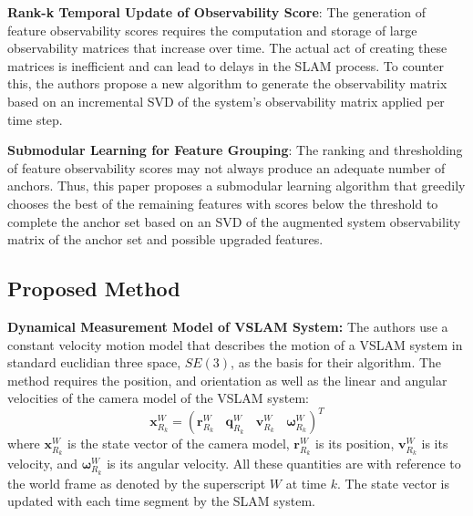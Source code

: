 \documentclass[10pt,twocolumn,letterpaper]{article}
\begin{document}
\textbf{Rank-k Temporal Update of Observability Score}: The generation of feature observability 
scores requires 
the computation and storage of large observability matrices that increase over time. 
The actual act of creating these matrices is inefficient and can lead to delays 
in the SLAM process. To counter this, the authors propose a new algorithm to generate the 
observability matrix 
based on an incremental SVD of the system's observability matrix applied per time step.

\textbf{Submodular Learning for Feature Grouping}: The ranking and thresholding of feature 
observability scores may not 
always produce an adequate number of anchors. 
Thus, this paper proposes a submodular learning algorithm that 
greedily chooses the best of the remaining features with scores 
below the threshold to complete the anchor set based on an 
SVD of the augmented system observability matrix of the anchor set and possible upgraded features. 

\subsection{Proposed Method}
\textbf{Dynamical Measurement Model of VSLAM System:}
The authors use a constant velocity motion model that describes the motion of a VSLAM system in standard 
euclidian three space, 
$SE(3)$, as the basis for their algorithm. The method requires the position, and orientation as well as the linear 
and angular velocities 
of the camera model of the VSLAM system: 
\begin{equation} \label{eq:stateVector}
\boldsymbol{x}_{R_k}^W = (\boldsymbol{r}_{R_k}^W \ \ \ \  \boldsymbol{q}_{R_k}^W  \ \ \ \  \boldsymbol{v}_{R_k}^W  \ \ \ \  \boldsymbol{\omega}_{R_k}^W)^T
\end{equation}
where $\boldsymbol{x}_{R_k}^W$ is the state vector of the camera model, 
$\boldsymbol{r}_{R_k}^W$ is its position, 
$\boldsymbol{v}_{R_k}^W$ is its velocity, 
and $\boldsymbol{\omega}_{R_k}^W$ is its angular velocity. All these quantities are with reference to the world frame as denoted by the superscript $W$ at time $k$. 
The state vector is updated with each time segment by the SLAM system. 
\end{document}
